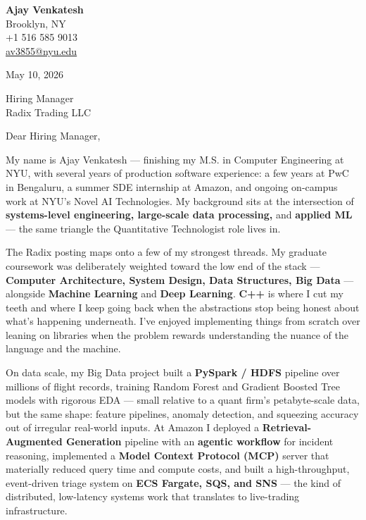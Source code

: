 \documentclass[letterpaper,11pt]{article}
\begin{document}
\begin{flushleft}
\textbf{\large Ajay Venkatesh} \\
Brooklyn, NY \\
+1 516 585 9013 \\
\href{mailto:av3855@nyu.edu}{av3855@nyu.edu}
\end{flushleft}

\vspace{10pt}

May 10, 2026

\vspace{6pt}

Hiring Manager \\
Radix Trading LLC

\vspace{10pt}

Dear Hiring Manager,

My name is Ajay Venkatesh --- finishing my M.S. in Computer Engineering at NYU, with several years of production software experience: a few years at PwC in Bengaluru, a summer SDE internship at Amazon, and ongoing on-campus work at NYU's Novel AI Technologies. My background sits at the intersection of \textbf{systems-level engineering, large-scale data processing,} and \textbf{applied ML} --- the same triangle the Quantitative Technologist role lives in.

The Radix posting maps onto a few of my strongest threads. My graduate coursework was deliberately weighted toward the low end of the stack --- \textbf{Computer Architecture, System Design, Data Structures, Big Data} --- alongside \textbf{Machine Learning} and \textbf{Deep Learning}. \textbf{C++} is where I cut my teeth and where I keep going back when the abstractions stop being honest about what's happening underneath. I've enjoyed implementing things from scratch over leaning on libraries when the problem rewards understanding the nuance of the language and the machine.

On data scale, my Big Data project built a \textbf{PySpark / HDFS} pipeline over millions of flight records, training Random Forest and Gradient Boosted Tree models with rigorous EDA --- small relative to a quant firm's petabyte-scale data, but the same shape: feature pipelines, anomaly detection, and squeezing accuracy out of irregular real-world inputs. At Amazon I deployed a \textbf{Retrieval-Augmented Generation} pipeline with an \textbf{agentic workflow} for incident reasoning, implemented a \textbf{Model Context Protocol (MCP)} server that materially reduced query time and compute costs, and built a high-throughput, event-driven triage system on \textbf{ECS Fargate, SQS, and SNS} --- the kind of distributed, low-latency systems work that translates to live-trading infrastructure.
\end{document}
